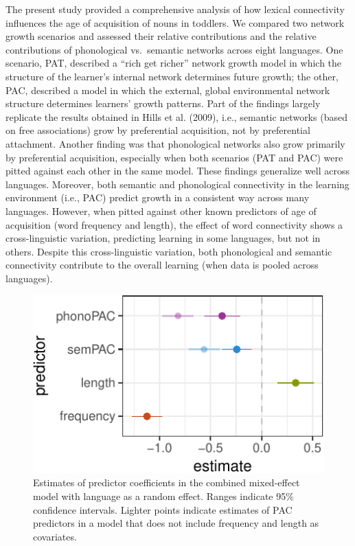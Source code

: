 \documentclass[10pt, letterpaper]{article}
\newenvironment{CodeChunk}{}{}
\begin{document}
The present study provided a comprehensive analysis of how lexical
connectivity influences the age of acquisition of nouns in toddlers. We
compared two network growth scenarios and assessed their relative
contributions and the relative contributions of phonological
vs.~semantic networks across eight languages. One scenario, PAT,
described a ``rich get richer'' network growth model in which the
structure of the learner's internal network determines future growth;
the other, PAC, described a model in which the external, global
environmental network structure determines learners' growth patterns.
Part of the findings largely replicate the results obtained in Hills et
al. (2009), i.e., semantic networks (based on free associations) grow by
preferential acquisition, not by preferential attachment. Another
finding was that phonological networks also grow primarily by
preferential acquisition, especially when both scenarios (PAT and PAC)
were pitted against each other in the same model. These findings
generalize well across languages. Moreover, both semantic and
phonological connectivity in the learning environment (i.e., PAC)
predict growth in a consistent way across many languages. However, when
pitted against other known predictors of age of acquisition (word
frequency and length), the effect of word connectivity shows a
cross-linguistic variation, predicting learning in some languages, but
not in others. Despite this cross-linguistic variation, both
phonological and semantic connectivity contribute to the overall
learning (when data is pooled across languages).

\begin{CodeChunk}
\begin{figure}[H]

{\centering \includegraphics{figs/regressions_all_img-1} 

}

\caption{\label{fig:regressions_all_img}Estimates of predictor coefficients in the combined mixed-effect model with language as a random effect. Ranges indicate 95\% confidence intervals. Lighter points indicate estimates of PAC predictors in a model that does not include frequency and length as covariates.}\label{fig:regressions_all_img}
\end{figure}
\end{CodeChunk}
\end{document}
